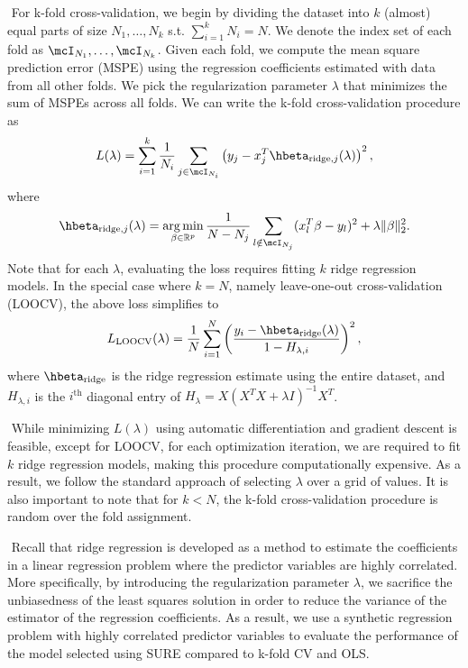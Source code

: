 $ $\newline
For k-fold cross-validation, we begin by dividing the dataset into $k$ (almost) equal parts of size $N_1,\dots, N_k$ s.t. $\sum_{i=1}^k N_i = N$. We denote the index set of each fold as $\mcI_{N_1}, \dots, \mcI_{N_k}$. Given each fold, we compute the mean square prediction error (MSPE) using the regression coefficients estimated with data from all other folds. We pick the regularization parameter $\lambda$ that minimizes the sum of MSPEs across all folds. We can write the k-fold cross-validation procedure as
\[
L(\lambda) = \sum_{i=1}^k \frac{1}{N_i} \sum_{j \in \mcI_{N_i}} \left(y_j - x_j^T\hbeta_{\text{ridge}, j}(\lambda)\right)^2,
\] 
where
\[
\hbeta_{\text{ridge}, j}(\lambda) = \argmin_{\beta\in\reals^p} \frac{1}{N-N_j}\sum_{l\notin\mcI_{N_j}}(x_l^T\beta - y_l)^2 + \lambda \|\beta\|_2^2.
\]
Note that for each $\lambda$, evaluating the loss requires fitting $k$ ridge regression models. In the special case where $k=N$, namely leave-one-out cross-validation (LOOCV), the above loss simplifies to
\[
L_{\text{LOOCV}}(\lambda) = \frac{1}{N}\sum_{i=1}^N \left( \frac{y_i - \hbeta_{\text{ridge}}(\lambda)}{1 - H_{\lambda,i}} \right)^2,
\]
where $\hbeta_{\text{ridge}}$ is the ridge regression estimate using the entire dataset, and $H_{\lambda,i}$ is the $i^\text{th}$ diagonal entry of $H_\lambda = X(X^TX + \lambda I)^{-1}X^T$.

$ $\newline
While minimizing $L(\lambda)$ using automatic differentiation and gradient descent is feasible, except for LOOCV, for each optimization iteration, we are required to fit $k$ ridge regression models, making this procedure computationally expensive. As a result, we follow the standard approach of selecting $\lambda$ over a grid of values. It is also important to note that for $k<N$, the k-fold cross-validation procedure is random over the fold assignment.

$ $\newline
Recall that ridge regression is developed as a method to estimate the coefficients in a linear regression problem where the predictor variables are highly correlated. More specifically, by introducing the regularization parameter $\lambda$, we sacrifice the unbiasedness of the least squares solution in order to reduce the variance of the estimator of the regression coefficients. As a result, we use a synthetic regression problem with highly correlated predictor variables to evaluate the performance of the model selected using SURE compared to k-fold CV and OLS.

